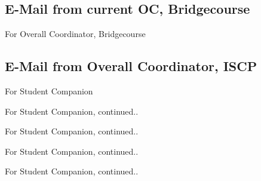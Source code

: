 \documentclass{article}
\begin{document}
	\subsection{E-Mail from current OC, Bridgecourse}
		For Overall Coordinator, Bridgecourse
		\begin{figure}[h]
		\end{figure}
\newpage
	\subsection{E-Mail from Overall Coordinator, ISCP}
		For Student Companion
		\begin{figure}[h]
		\end{figure}
\newpage
		For Student Companion, continued..
		\begin{figure}[h]
		\end{figure}
\newpage
		For Student Companion, continued..
		\begin{figure}[h]
		\end{figure}
\newpage
		For Student Companion, continued..
		\begin{figure}[h]
		\end{figure}
\newpage
		For Student Companion, continued..
		\begin{figure}[h]
		\end{figure}
\newpage
\end{document}
